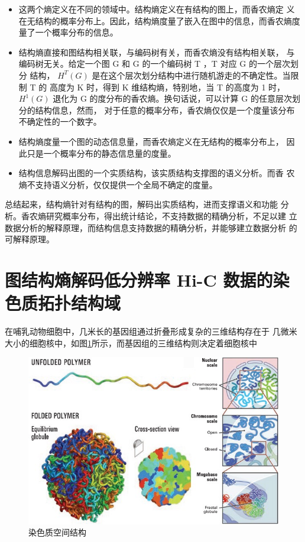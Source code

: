 \documentclass[a4paper]{apa6}
\begin{document}
\begin{itemize}
\item 这两个熵定义在不同的领域中。结构熵定义在有结构的图上，而香农熵定 义在无结构的概率分布上。因此，结构熵度量了嵌入在图中的信息，而香农熵度 量了一个概率分布的信息。
\item 结构熵直接和图结构相关联，与编码树有关，而香农熵没有结构相关联， 与编码树无关。给定一个图 G 和 G 的一个编码树 T ，T 对应 G 的一个层次划分 结构， \(H^T (G)\) 是在这个层次划分结构中进行随机游走的不确定性。当限制 T 的 高度为 K 时，得到 K 维结构熵，特别地，当 T 的高度为 1 时，\(H^1(G)\) 退化为 G 的度分布的香农熵。换句话说，可以计算 G 的任意层次划分的结构信息，然而， 对于任意的概率分布，香农熵仅仅是一个度量该分布不确定性的一个数字。
\item 结构熵度量一个图的动态信息量，而香农熵定义在无结构的概率分布上， 因此只是一个概率分布的静态信息量的度量。
\item 结构信息解码出图的一个实质结构，该实质结构支撑图的语义分析。而香 农熵不支持语义分析，仅仅提供一个全局不确定的度量。
\end{itemize}

总结起来，结构熵针对有结构的图，解码出实质结构，进而支撑语义和功能 分析。香农熵研究概率分布，得出统计结论，不支持数据的精确分析，不足以建 立数据分析的解释原理，而结构信息支持数据的精确分析，并能够建立数据分析 的可解释原理。


\section{图结构熵解码低分辨率 Hi-C 数据的染色质拓扑结构域}
\label{sec:orgbd78221}
在哺乳动物细胞中，几米长的基因组通过折叠形成复杂的三维结构存在于 几微米大小的细胞核中，如图\ref{fig:chromatin-spatial-structure}所示，而基因组的三维结构则决定着细胞核中

\begin{figure}[htbp]
\centering
\includegraphics[width=.9\linewidth]{./asset/chromatin-spatial-structure.jpg}
\caption{\label{fig:chromatin-spatial-structure}染色质空间结构}
\end{figure}
\end{document}
